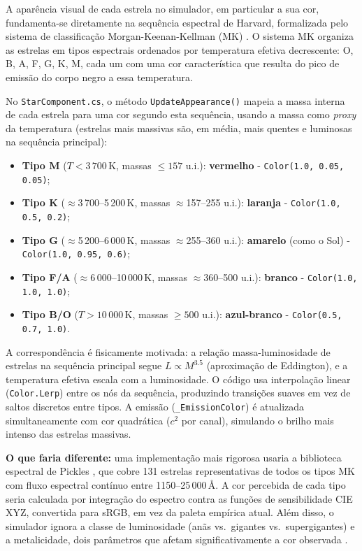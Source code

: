 \documentclass[12pt,a4paper]{article}
\begin{document}
A aparência visual de cada estrela no simulador, em particular a sua cor, fundamenta-se diretamente na sequ\^{e}ncia espectral de Harvard, formalizada pelo sistema de classifica\c{c}\~{a}o Morgan-Keenan-Kellman (MK) \cite{morgan1943,keenan1985}. O sistema MK organiza as estrelas em tipos espectrais ordenados por temperatura efetiva decrescente: O, B, A, F, G, K, M, cada um com uma cor característica que resulta do pico de emiss\~{a}o do corpo negro a essa temperatura.

No \texttt{StarComponent.cs}, o método \texttt{UpdateAppearance()} mapeia a massa interna de cada estrela para uma cor segundo esta sequ\^{e}ncia, usando a massa como \textit{proxy} da temperatura (estrelas mais massivas s\~{a}o, em m\'{e}dia, mais quentes e luminosas na sequ\^{e}ncia principal):

\begin{itemize}
  \item \textbf{Tipo M} ($T < 3\,700$\,K, massas $\leq 157$ u.i.): \textbf{vermelho} - \texttt{Color(1.0, 0.05, 0.05)};
  \item \textbf{Tipo K} ($\approx$3\,700--5\,200\,K, massas $\approx$157--255 u.i.): \textbf{laranja} - \texttt{Color(1.0, 0.5, 0.2)};
  \item \textbf{Tipo G} ($\approx$5\,200--6\,000\,K, massas $\approx$255--360 u.i.): \textbf{amarelo} (como o Sol) - \texttt{Color(1.0, 0.95, 0.6)};
  \item \textbf{Tipo F/A} ($\approx$6\,000--10\,000\,K, massas $\approx$360--500 u.i.): \textbf{branco} - \texttt{Color(1.0, 1.0, 1.0)};
  \item \textbf{Tipo B/O} ($T > 10\,000$\,K, massas $\geq 500$ u.i.): \textbf{azul-branco} - \texttt{Color(0.5, 0.7, 1.0)}.
\end{itemize}

A correspond\^{e}ncia \'{e} fisicamente motivada: a rela\c{c}\~{a}o massa-luminosidade de estrelas na sequ\^{e}ncia principal segue $L \propto M^{3.5}$ (aproxima\c{c}\~{a}o de Eddington), e a temperatura efetiva escala com a luminosidade. O c\'{o}digo usa interpola\c{c}\~{a}o linear (\texttt{Color.Lerp}) entre os n\'{o}s da sequ\^{e}ncia, produzindo transi\c{c}\~{o}es suaves em vez de saltos discretos entre tipos. A emiss\~{a}o (\texttt{\_EmissionColor}) \'{e} atualizada simultaneamente com cor quadr\'{a}tica ($c^2$ por canal), simulando o brilho mais intenso das estrelas massivas.

\textbf{O que faria diferente:} uma implementa\c{c}\~{a}o mais rigorosa usaria a biblioteca espectral de Pickles \cite{pickles1998}, que cobre 131 estrelas representativas de todos os tipos MK com fluxo espectral contínuo entre 1150--25\,000\,\AA. A cor percebida de cada tipo seria calculada por integra\c{c}\~{a}o do espectro contra as fun\c{c}\~{o}es de sensibilidade CIE XYZ, convertida para sRGB, em vez da paleta empírica atual. Al\'{e}m disso, o simulador ignora a classe de luminosidade (an\~{a}s vs.\ gigantes vs.\ supergigantes) e a metalicidade, dois par\^{a}metros que afetam significativamente a cor observada \cite{keenan1985}.
\end{document}
